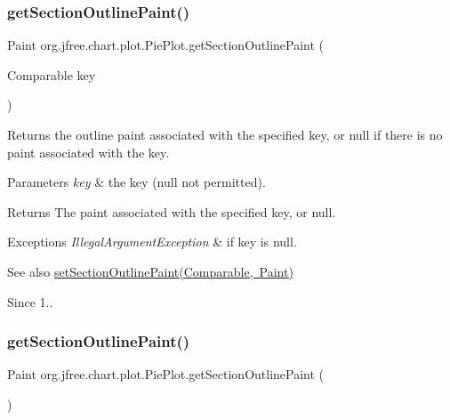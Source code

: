 \subsubsection{\texorpdfstring{get\+Section\+Outline\+Paint()}{getSectionOutlinePaint()}\hspace{0.1cm}{\footnotesize\ttfamily [1/3]}}
{\footnotesize\ttfamily Paint org.\+jfree.\+chart.\+plot.\+Pie\+Plot.\+get\+Section\+Outline\+Paint (\begin{DoxyParamCaption}\item[{Comparable}]{key }\end{DoxyParamCaption})}

Returns the outline paint associated with the specified key, or {\ttfamily null} if there is no paint associated with the key.


\begin{DoxyParams}{Parameters}
{\em key} & the key ({\ttfamily null} not permitted).\\
\hline
\end{DoxyParams}
\begin{DoxyReturn}{Returns}
The paint associated with the specified key, or {\ttfamily null}.
\end{DoxyReturn}

\begin{DoxyExceptions}{Exceptions}
{\em Illegal\+Argument\+Exception} & if {\ttfamily key} is {\ttfamily null}.\\
\hline
\end{DoxyExceptions}
\begin{DoxySeeAlso}{See also}
\mbox{\hyperlink{classorg_1_1jfree_1_1chart_1_1plot_1_1_pie_plot_a07d24c6dfd9bde2ec5db77a1bed07506}{set\+Section\+Outline\+Paint(\+Comparable, Paint)}}
\end{DoxySeeAlso}
\begin{DoxySince}{Since}
1.. 
\end{DoxySince}
\mbox{\label{classorg_1_1jfree_1_1chart_1_1plot_1_1_pie_plot_a237fbccf0cd23d51f4e62dfcd4a48e1d}} 
\subsubsection{\texorpdfstring{get\+Section\+Outline\+Paint()}{getSectionOutlinePaint()}\hspace{0.1cm}{\footnotesize\ttfamily [2/3]}}
{\footnotesize\ttfamily Paint org.\+jfree.\+chart.\+plot.\+Pie\+Plot.\+get\+Section\+Outline\+Paint (\begin{DoxyParamCaption}{ }\end{DoxyParamCaption})}

